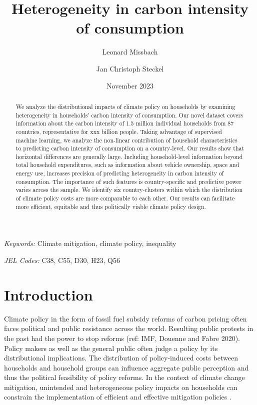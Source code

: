 \documentclass[12pt, a4paper]{article}
\title{Heterogeneity in carbon intensity of consumption}
\author[1,2,*]{Leonard Missbach}
\author[1,3]{Jan Christoph Steckel}
\affil[1]{\small Mercator Research Institute on Global Commons and Climate Change, Berlin, Germany}
\affil[2]{\small Technical University of Berlin, Berlin, Germany}
\affil[3]{\small Brandenburg University of Technology Cottbus Senftenberg, Cottbus, Germany}
\affil[*]{\normalsize Corresponding author: \href{mailto:missbach@mcc-berlin.net}{missbach@mcc-berlin.net}}
\date{November 2023}
\begin{document}
\maketitle
\begin{abstract}
  We analyze the distributional impacts of climate policy on households by examining heterogeneity in households' carbon intensity of consumption. Our novel dataset covers information about the carbon intensity of 1.5 million individual households from 87 countries, representative for xxx billion people. Taking advantage of supervised machine learning, we analyze the non-linear contribution of household characteristics to predicting carbon intensity of consumption on a country-level.
   Our results show that horizontal differences are generally large. Including household-level information beyond total household expenditures, such as information about vehicle ownership, space and energy use, increases precision of predicting heterogeneity in carbon intensity of consumption. The importance of such features is country-specific and predictive power varies across the sample. We identify six country-clusters within which the distribution of climate policy costs are more comparable to each other. Our results can facilitate more efficient, equitable and thus politically viable climate policy design.   
\end{abstract}

\smallskip

\noindent \small \textit{Keywords:} Climate mitigation, climate policy, inequality

\noindent \small \textit{JEL Codes:} C38, C55, D30, H23, Q56

\thispagestyle{empty}
\clearpage
\setcounter{page}{1}

\section{Introduction} \label{sec:introduction}

Climate policy in the form of fossil fuel subsidy reforms of carbon pricing often faces political and public resistance across the world. Resulting public protests in the past had the power to stop reforms (ref: IMF, Douenne and Fabre 2020). Policy makers as well as the general public often judge a policy by its distributional implications. The distribution of policy-induced costs between households and household groups can influence aggregate public perception and thus the political feasibility of policy reforms. In the context of climate change mitigation, unintended and heterogeneous policy impacts on households can constrain the implementation of efficient and effective mitigation policies \autocite{MaestreAndres.2019,Dechezlepretre.2022}.
\end{document}
